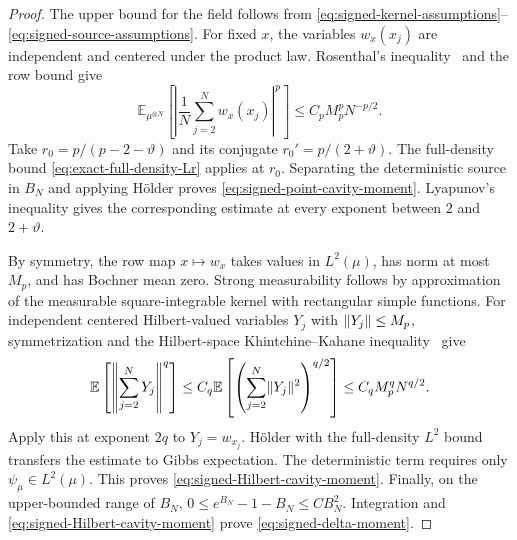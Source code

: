 \documentclass[11pt,reqno]{amsart}
\numberwithin{equation}{section}
\theoremstyle{plain}
\theoremstyle{remark}
\DeclarePairedDelimiter{\norm}{\lVert}{\rVert}
\newcommand{\E}{{\mathbb{E}}}
\begin{document}
\begin{proof}
The upper bound for the field follows from
\eqref{eq:signed-kernel-assumptions}--\eqref{eq:signed-source-assumptions}.
For fixed $x$, the variables $w_x(x_j)$ are independent and centered under
the product law.  Rosenthal's inequality~\cite{Rosenthal1970} and the row
bound give
\begin{equation}\label{eq:signed-product-row-moment}
 \E_{\mu^{\otimes N}}\left[\left|\frac1N\sum_{j=2}^Nw_x(x_j)\right|^p\right]
 \leq C_pM_p^pN^{-p/2}.
\end{equation}
Take $r_0=p/(p-2-\vartheta)$ and its conjugate $r_0'=p/(2+\vartheta)$.
The full-density bound \eqref{eq:exact-full-density-Lr} applies at $r_0$.
Separating the deterministic source in $B_N$ and applying H\"older proves
\eqref{eq:signed-point-cavity-moment}.  Lyapunov's inequality gives the
corresponding estimate at every exponent between $2$ and $2+\vartheta$.

By symmetry, the row map $x\mapsto w_x$ takes values in $L^2(\mu)$, has
norm at most $M_p$, and has Bochner mean zero.  Strong measurability follows
by approximation of the measurable square-integrable kernel with
rectangular simple functions.  For independent centered Hilbert-valued
variables $Y_j$ with $\norm{Y_j}\leq M_p$, symmetrization and the
Hilbert-space Khintchine--Kahane inequality~\cite{Kahane1985} give
\begin{equation}\label{eq:signed-Hilbert-product-sum}
 \E\left[\left\|\sum_{j=2}^NY_j\right\|^q\right]
 \leq C_q\E\left[\left(\sum_{j=2}^N\norm{Y_j}^2\right)^{q/2}\right]
 \leq C_qM_p^qN^{q/2}.
\end{equation}
Apply this at exponent $2q$ to $Y_j=w_{x_j}$.  H\"older with the
full-density $L^2$ bound transfers the estimate to Gibbs expectation.
The deterministic term requires only $\psi_\mu\in L^2(\mu)$.  This proves
\eqref{eq:signed-Hilbert-cavity-moment}.  Finally, on the upper-bounded
range of $B_N$, $0\leq e^{B_N}-1-B_N\leq CB_N^2$.  Integration and
\eqref{eq:signed-Hilbert-cavity-moment} prove
\eqref{eq:signed-delta-moment}.
\end{proof}
\end{document}
